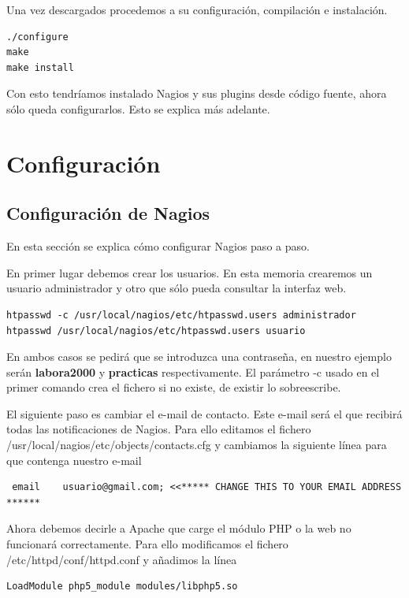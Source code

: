 \documentclass[11pt,a4paper]{article}
\begin{document}
Una vez descargados procedemos a su configuración, compilación e instalación.

\begin{verbatim}
./configure
make
make install
\end{verbatim}

Con esto tendríamos instalado Nagios y sus plugins desde código fuente, ahora sólo queda configurarlos. Esto se explica más adelante.

\section{Configuración}

\subsection{Configuración de Nagios}
En esta sección se explica cómo configurar Nagios paso a paso.

En primer lugar debemos crear los usuarios. En esta memoria crearemos un usuario administrador y otro que sólo pueda consultar la interfaz web.

\begin{verbatim}
htpasswd -c /usr/local/nagios/etc/htpasswd.users administrador
htpasswd /usr/local/nagios/etc/htpasswd.users usuario
\end{verbatim}

En ambos casos se pedirá que se introduzca una contraseña, en nuestro ejemplo serán \textbf{labora2000} y \textbf{practicas} respectivamente. El parámetro -c usado en el primer comando crea el fichero si no existe, de existir lo sobreescribe.

El siguiente paso es cambiar el e-mail de contacto. Este e-mail será el que recibirá todas las notificaciones de Nagios. Para ello editamos el fichero /usr/local/nagios/etc/objects/contacts.cfg y cambiamos la siguiente línea para que contenga nuestro e-mail

\begin{verbatim}
 email    usuario@gmail.com; <<***** CHANGE THIS TO YOUR EMAIL ADDRESS ******
\end{verbatim}

Ahora debemos decirle a Apache que carge el módulo PHP o la web no funcionará correctamente. Para ello modificamos el fichero /etc/httpd/conf/httpd.conf y añadimos la línea

\begin{verbatim}
LoadModule php5_module modules/libphp5.so
\end{verbatim}
\end{document}
